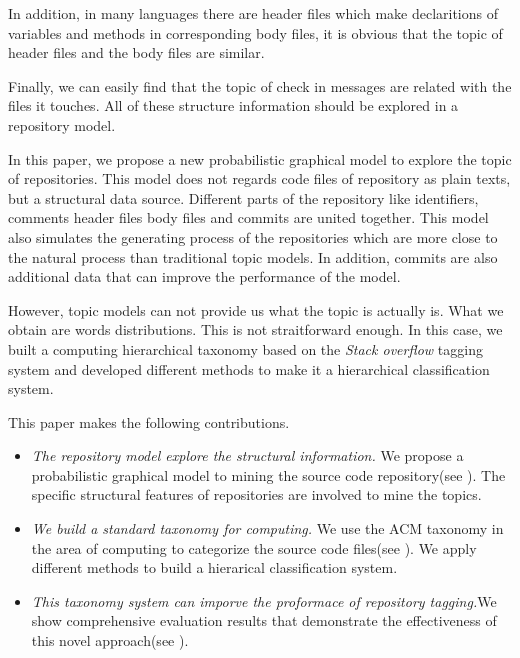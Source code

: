 In addition, in many languages there are header files which make declaritions 
of variables and methods in corresponding body files, it is obvious that the topic of
header files and the body files are similar.

Finally, we can easily find that the topic of check in messages are related with the 
files it touches. All of these structure information should be explored in a repository model.

In this paper, we propose a new probabilistic graphical model to explore the 
topic of repositories. This model does not regards code files of repository as plain texts, but a 
structural data source. Different parts of the repository like identifiers, comments
header files body files and commits are united together. This model also simulates the 
generating process of the repositories which are more close to the natural process than
traditional topic models. In addition, commits are also additional data that can improve
the performance of the model.

However, topic models can not provide us what the topic is actually is. What we obtain are words 
distributions. This is not straitforward enough. In this case, we built a computing hierarchical
taxonomy based on the {\it Stack overflow} tagging system and developed different methods to make it a 
hierarchical classification system.


This paper makes the following contributions.
\begin{itemize}
\item {\em The repository model explore the structural information.}
We propose a probabilistic graphical model to mining the source code 
repository(see ). The specific structural features of 
repositories are involved to mine the topics.


\item {\em We build a standard taxonomy for computing.}
We use the ACM taxonomy in the area of computing to categorize the source 
code files(see ). We apply different methods to build a 
hierarical classification system.


\item {\em This taxonomy system can imporve the proformace of repository
tagging.}We show comprehensive evaluation results that demonstrate the
effectiveness of this novel approach(see ).
\end{itemize}



